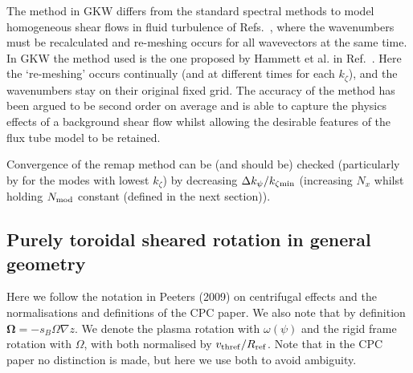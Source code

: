 \documentclass{report}
\renewcommand{\vec}{\bm}
\def\be{\begin{equation}}
\def\ee{\end{equation}}
\begin{document}
The method in GKW differs from the standard spectral methods to model homogeneous shear flows in fluid turbulence of
Refs.~\cite{Rogallo81,Zang88,Pumir96}, where the wavenumbers must be recalculated and re-meshing occurs for all wavevectors 
at the same time. 
In GKW the method used is the one proposed by Hammett et al. in Ref.~\cite{HammettAPS06}.  
Here the `re-meshing' occurs continually (and at different times for each $k_\zeta$), and the wavenumbers stay on their original fixed grid.  
The accuracy of the method has been argued to be second order on average \cite{HammettAPS06} and
is able to capture the physics effects of a 
background shear flow whilst allowing the desirable features of the flux tube model to be retained.
 
Convergence of the remap method can be (and should be) checked (particularly by for the modes with lowest $k_\zeta$) by decreasing 
$\Delta k_\psi / k_{\zeta {\rm min}}$ (increasing $N_x$ whilst holding $N_{\rm mod}$ constant (defined in the next section)).



\subsection{Purely toroidal sheared rotation in general geometry}

Here we follow the notation in Peeters (2009) on centrifugal effects \cite{PEE09}
and the normalisations and definitions of the CPC paper.  We also note that by definition
$\vec{\Omega}=-s_B \Omega \nabla z$.  We denote the plasma rotation with $\omega(\psi)$ and the
rigid frame rotation with $\Omega$, with both normalised by $v_{\rm thref} / {R_{\rm ref}}$.  Note
that in the CPC paper no distinction is made, but here we use both to avoid ambiguity.
\end{document}
